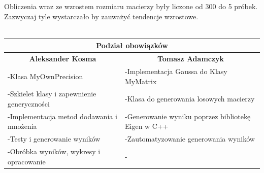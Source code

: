 \documentclass[8pt]{article}
\begin{document}
Obliczenia wraz ze wzrostem rozmiaru macierzy były liczone od 300 do 5 próbek. Zazwyczaj tyle wystarczało by zauważyć tendencje wzrostowe.\\
\\
\begin{tabular}{ | p{8.2cm} | p{8.2cm} | }
  \hline
  \multicolumn{2}{|c|}{Podział obowiązków} \\
  \hline
  \multicolumn{1}{|c|}{\textbf{Aleksander Kosma} }& \multicolumn{1}{|c|}{\textbf{Tomasz Adamczyk}} \\
  \hline
  -Klasa MyOwnPrecision & -Implementacja  Gaussa do Klasy MyMatrix \\\hline
  -Szkielet klasy i zapewnienie generyczności & -Klasa do generowania losowych macierzy \\\hline
  -Implementacja metod dodawania i mnożenia & -Generowanie wyniku poprzez bibliotekę Eigen w C++ \\\hline
  -Testy i generowanie wyników & -Zautomatyzowanie generowania wyników \\\hline
  -Obróbka wyników, wykresy i opracowanie & - \\\hline
  
  \hline
\end{tabular}
\end{document}
